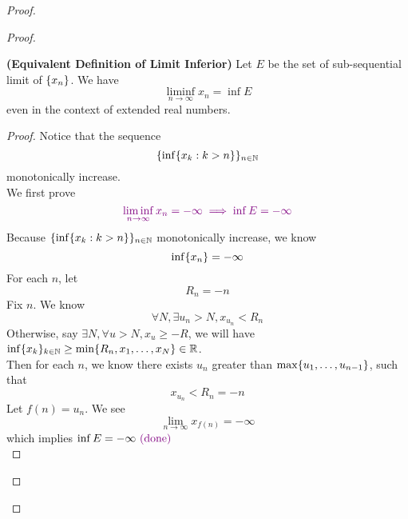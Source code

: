 \documentclass{report}
\begin{document}
\begin{proof}
\begin{proof}
{\begin{minipage}{39em}
\end{minipage}}

\begin{theorem}
\label{4.3.8}
\textbf{(Equivalent Definition of Limit Inferior)} Let $E$ be the set of sub-sequential limit of $\{ x_n \}$. We have
\begin{equation}
\liminf_{n\to\infty} x_n=\inf E
\end{equation}
even in the context of extended real numbers. 
\end{theorem}
\begin{proof}
Notice that the sequence 
\begin{equation}
\{ \inf \{ x_k:k>n \} \}_{n\in\mathbb{N}}
\end{equation}
monotonically increase.\\

We first prove
\begin{equation}
\textcolor{violet}{\liminf_{n\to\infty} x_n=-\infty\implies \inf E=-\infty}
\end{equation}
Because $\{ \inf \{ x_k:k>n \} \}_{n\in\mathbb{N}}$ monotonically increase, we know
\begin{equation}
\inf \{ x_n \}=-\infty
\end{equation}
For each $n$,  let 
\begin{equation}
R_n=-n
\end{equation}
Fix $n$. We know 
\begin{equation}
\forall N, \exists u_n>N,x_{u_n}<R_n
\end{equation}
Otherwise, say $\exists N,\forall u>N, x_u\geq -R$, we will have $\inf \{ x_k \}_{k\in\mathbb{N}}\geq \min \{ R_n,x_1,\dots ,x_N \}\in\mathbb{R}$.\\

Then for each $n$, we know there exists $u_n$ greater than  $\max \{ u_1,\dots , u_{n-1} \}$, such that 
\begin{equation}
x_{u_n}<R_n=-n
\end{equation}
Let $f(n)=u_n$. We see
\begin{equation}
\lim_{n\to\infty}x_{f(n)}=-\infty 
\end{equation}
which implies $\inf E=-\infty\textcolor{violet}{\text{ (done) }}$\\


\end{proof}
\end{proof}
\end{proof}
\end{document}
